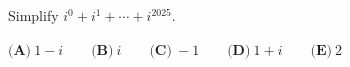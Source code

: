 Simplify $i^0+i^1+\cdots+i^{2025}.$

$\textbf{(A)}~1-i\qquad\textbf{(B)}~i\qquad\textbf{(C)}~-1\qquad\textbf{(D)}~1+i\qquad\textbf{(E)}~2\qquad$
